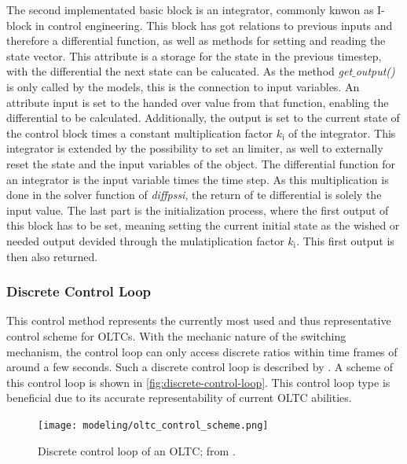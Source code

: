 The second implementated basic block is an integrator, commonly knwon as I-block in control engineering.
This block has got relations to previous inputs and therefore a differential function, as well as methods for setting and reading the state vector.
This attribute is a storage for the state in the previous timestep, with the differential the next state can be calucated.
As the method \textit{get$\_$output()} is only called by the models, this is the connection to input variables.
An attribute input is set to the handed over value from that function, enabling the differential to be calculated.
Additionally, the output is set to the current state of the control block times a constant multiplication factor $k_\mathrm{i}$ of the integrator.
This integrator is extended by the possibility to set an limiter, as well to externally reset the state and the input variables of the object.
The differential function for an integrator is the input variable times the time step.
As this multiplication is done in the solver function of \textit{diffpssi}, the return of te differential is solely the input value.
The last part is the initialization process, where the first output of this block has to be set, meaning setting the current initial state as the wished or needed output devided through the mulatiplication factor $k_\mathrm{i}$.
This first output is then also returned.

\subsubsection{Discrete Control Loop}

This control method represents the currently most used and thus representative control scheme for \acsp{OLTC}. 
With the mechanic nature of the switching mechanism, the control loop can only access discrete ratios within time frames of around a few seconds. 
Such a discrete control loop is described by \textcite{milano_2011,milano_2010}. 
A scheme of this control loop is shown in \autoref{fig:discrete-control-loop}.
This control loop type is beneficial due to its accurate representability of current \acs{OLTC} abilities. 

\begin{figure}[htbp!]
        \centering
        \texttt{[image: modeling/oltc\_control\_scheme.png]}
        \caption{Discrete control loop of an \acs{OLTC}; from \textcite{milano_2011}.}
        \label{fig:discrete-control-loop}
\end{figure}


